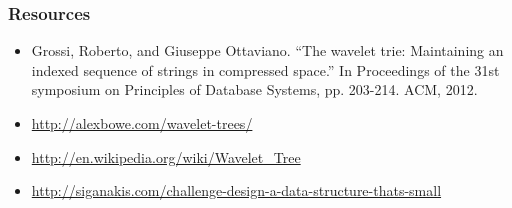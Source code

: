 \documentclass{beamer}
\begin{document}
\begin{frame}
\frametitle{Resources}
\begin{itemize}
  \item Grossi, Roberto, and Giuseppe Ottaviano. ``The wavelet trie: Maintaining an indexed sequence of strings in compressed space.'' In Proceedings of the 31st symposium on Principles of Database Systems, pp. 203-214. ACM, 2012.
  \item \url{http://alexbowe.com/wavelet-trees/}
  \item \url{http://en.wikipedia.org/wiki/Wavelet_Tree}
  \item \url{http://siganakis.com/challenge-design-a-data-structure-thats-small}
\end{itemize}
\end{frame}
 
 

\end{document}
